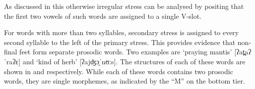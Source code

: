 \begin{exe}
\end{exe}

As discussed in  this otherwise irregular stress
can be analysed by positing that the first two vowels of such words
are assigned to a single V-slot.

For words with more than two syllables,
secondary stress is assigned to every second syllable to the left of the primary stress.
This provides evidence that non-final feet form separate prosodic words.
Two examples are  `praying mantis' {\ra} [ʔat̪aʔˈraʔɛ]{}
and  `kind of herb' [ʔajʤɔ̝ˈnʊːs]{}.
The structures of each of these words are shown in 
and  respectively.
While each of these words contains two prosodic words,
they are single morphemes, as indicated by the ``M'' on the bottom tier.


